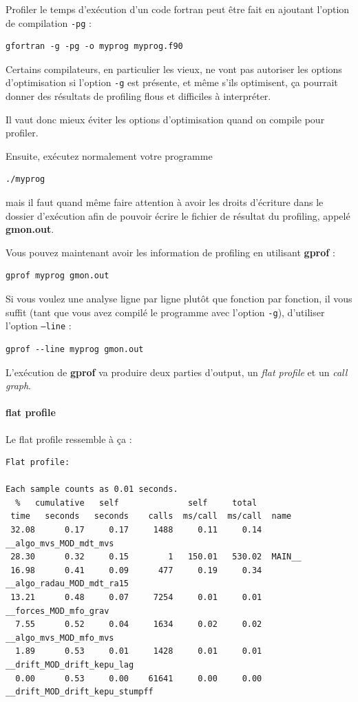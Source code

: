 \documentclass[a4paper,twoside]{article}
\begin{document}
Profiler le temps d'exécution d'un code fortran peut être fait en ajoutant l'option de compilation \texttt{-pg} : 
\begin{verbatim}
gfortran -g -pg -o myprog myprog.f90
\end{verbatim}

\begin{remarque}
Certains compilateurs, en particulier les vieux, ne vont pas autoriser les options d'optimisation si l'option \texttt{-g} est présente, et même s'ils optimisent, ça pourrait donner des résultats de profiling flous et difficiles à interpréter. 

Il vaut donc mieux éviter les options d'optimisation quand on compile pour profiler. 
\end{remarque}

Ensuite, exécutez normalement votre programme
\begin{verbatim}
./myprog
\end{verbatim}
mais il faut quand même faire attention à avoir les droits d'écriture dans le dossier d'exécution afin de pouvoir écrire le fichier de résultat du profiling, appelé \textbf{gmon.out}. 

\bigskip

Vous pouvez maintenant avoir les information de profiling en utilisant \textbf{gprof} :
\begin{verbatim}
gprof myprog gmon.out
\end{verbatim}

\begin{remarque}
Si vous voulez une analyse ligne par ligne plutôt que fonction par fonction, il vous suffit (tant que vous avez compilé le programme avec l'option \texttt{-g}), d'utiliser l'option \texttt{--line} :
\begin{verbatim}
gprof --line myprog gmon.out
\end{verbatim}
\end{remarque}

L'exécution de \textbf{gprof} va produire deux parties d'output, un \textit{flat profile} et un \textit{call graph}.
\paragraph{flat profile}
Le flat profile ressemble à ça : 
\begin{verbatim}
Flat profile:

Each sample counts as 0.01 seconds.
  %   cumulative   self              self     total           
 time   seconds   seconds    calls  ms/call  ms/call  name    
 32.08      0.17     0.17     1488     0.11     0.14  __algo_mvs_MOD_mdt_mvs
 28.30      0.32     0.15        1   150.01   530.02  MAIN__
 16.98      0.41     0.09      477     0.19     0.34  __algo_radau_MOD_mdt_ra15
 13.21      0.48     0.07     7254     0.01     0.01  __forces_MOD_mfo_grav
  7.55      0.52     0.04     1634     0.02     0.02  __algo_mvs_MOD_mfo_mvs
  1.89      0.53     0.01     1428     0.01     0.01  __drift_MOD_drift_kepu_lag
  0.00      0.53     0.00    61641     0.00     0.00  __drift_MOD_drift_kepu_stumpff
\end{verbatim}
\end{document}

